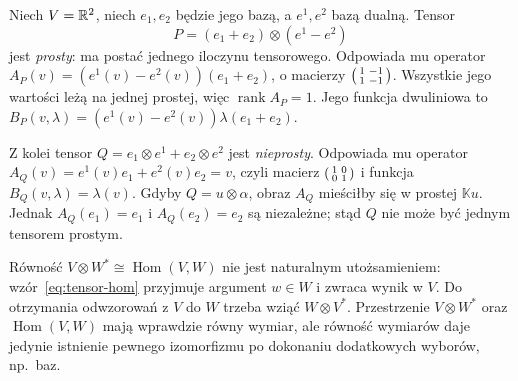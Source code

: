 \begin{przyklad}
Niech $V=\mathbb{R}^2$, niech $e_1,e_2$ będzie jego bazą, a
$e^1,e^2$ bazą dualną. Tensor
\[
 P=(e_1+e_2)\otimes(e^1-e^2)
\]
jest \emph{prosty}: ma postać jednego iloczynu tensorowego.
Odpowiada mu operator $A_P(v)=(e^1(v)-e^2(v))(e_1+e_2)$,
o macierzy
$\begin{psmallmatrix}1&-1\\1&-1\end{psmallmatrix}$.
Wszystkie jego wartości leżą na jednej prostej, więc
$\operatorname{rank}A_P=1$. Jego funkcja dwuliniowa to
$B_P(v,\lambda)=(e^1(v)-e^2(v))\lambda(e_1+e_2)$.

Z kolei tensor
$Q=e_1\otimes e^1+e_2\otimes e^2$ jest
\emph{nieprosty}. Odpowiada mu operator
$A_Q(v)=e^1(v)e_1+e^2(v)e_2=v$, czyli macierz
$\begin{psmallmatrix}1&0\\0&1\end{psmallmatrix}$ i funkcja
$B_Q(v,\lambda)=\lambda(v)$. Gdyby $Q=u\otimes\alpha$,
obraz $A_Q$ mieściłby się w prostej $\mathbb Ku$.
Jednak $A_Q(e_1)=e_1$ i $A_Q(e_2)=e_2$ są niezależne;
stąd $Q$ nie może być jednym tensorem prostym.
\end{przyklad}

\begin{uwaga}
Równość $V\otimes W^*\cong\operatorname{Hom}(V,W)$
nie jest naturalnym utożsamieniem: wzór~\eqref{eq:tensor-hom}
przyjmuje argument $w\in W$ i zwraca wynik w $V$.
Do otrzymania odwzorowań z $V$ do $W$ trzeba wziąć
$W\otimes V^*$. Przestrzenie $V\otimes W^*$ oraz
$\operatorname{Hom}(V,W)$ mają wprawdzie równy wymiar,
ale równość wymiarów daje jedynie istnienie pewnego
izomorfizmu po dokonaniu dodatkowych wyborów, np.\ baz.
\end{uwaga}

